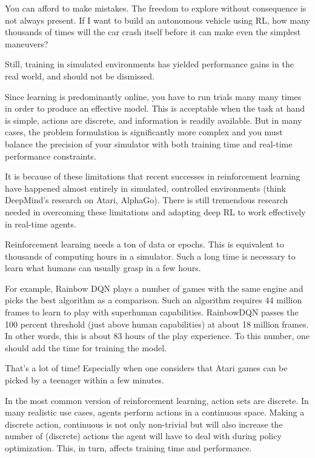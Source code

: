 \documentclass[conference]{IEEEtran}
\begin{document}
You can afford to make mistakes. The freedom to explore without consequence is not always present. If I want to build an autonomous vehicle using RL, how many thousands of times will the car crash itself before it can make even the simplest maneuvers?

Still, training in simulated environments has yielded performance gains in the real world, and should not be dismissed.

Since learning is predominantly online, you have to run trials many many times in order to produce an effective model. This is acceptable when the task at hand is simple, actions are discrete, and information is readily available. But in many cases, the problem formulation is significantly more complex and you must balance the precision of your simulator with both training time and real-time performance constraints.

It is because of these limitations that recent successes in reinforcement learning have happened almost entirely in simulated, controlled environments (think DeepMind's research on Atari, AlphaGo). There is still tremendous research needed in overcoming these limitations and adapting deep RL to work effectively in real-time agents.

Reinforcement learning needs a ton of data or epochs. This is equivalent to thousands of computing hours in a simulator. Such a long time is necessary to learn what humans can usually grasp in a few hours.

For example, Rainbow DQN plays a number of games with the same engine and picks the best algorithm as a comparison. Such an algorithm requires 44 million frames to learn to play with superhuman capabilities. RainbowDQN passes the 100 percent threshold (just above human capabilities) at about 18 million frames. In other words, this is about 83 hours of the play experience. To this number, one should add the time for training the model.

That’s a lot of time! Especially when one considers that Atari games can be picked by a teenager within a few minutes.

In the most common version of reinforcement learning, action sets are discrete. In many realistic use cases, agents perform actions in a continuous space. Making a discrete action, continuous is not only non-trivial but will also increase the number of (discrete) actions the agent will have to deal with during policy optimization. This, in turn, affects training time and performance.
\end{document}
